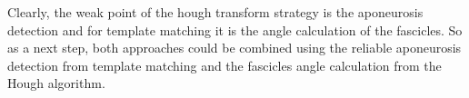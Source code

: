 \documentclass[10pt,twocolumn,letterpaper]{article}
\begin{document}
Clearly, the weak point of the hough transform strategy is the aponeurosis detection and for template matching it is the angle calculation of the fascicles. So as a next step, both approaches could be combined using the reliable aponeurosis detection from template matching and the fascicles angle calculation from the Hough algorithm.

{\small


}
\end{document}
